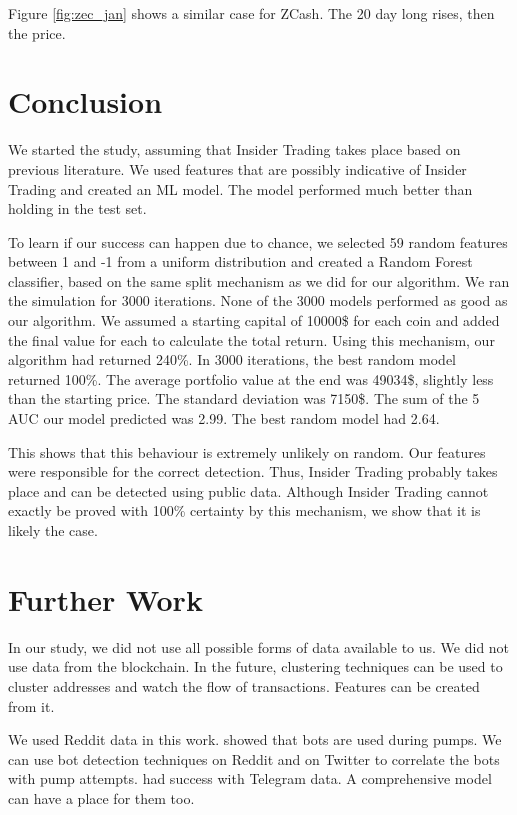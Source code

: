 \documentclass[letterpaper]{article}
\begin{document}
Figure \ref{fig:zec_jan} shows a similar case for ZCash. The 20 day long rises, then the price. 

\section{Conclusion}
\label{sec:conclusion}
We started the study, assuming that Insider Trading takes place based on previous literature. 
We used features that are possibly indicative of Insider Trading 
and created an ML model. The model performed much better than holding in the test set. \par

To learn if our success can happen due to chance, 
we selected 59 random features between 1 and -1 from a uniform distribution and created a 
Random Forest classifier, based on the same split mechanism as we did for our algorithm.
We ran the simulation for 3000 iterations. None of the 3000 models performed 
as good as our algorithm. We assumed a starting capital of 10000\$ for each coin and added the final 
value for each to calculate the total return. Using this mechanism, our algorithm had returned 
240\%. In 3000 iterations, the best random 
model returned 100\%. The average portfolio value at the end was 49034\$, slightly less than the starting price. 
The standard deviation was 7150\$. 
The sum of the 5 AUC our model predicted was 2.99. The best random model had 2.64.
 \par

 This shows that this behaviour is extremely unlikely on random. Our features were responsible for the correct 
 detection. Thus, Insider Trading probably 
takes place and can be detected using public data. Although Insider Trading cannot exactly be proved with 
100\% certainty by 
this mechanism, we show that it is likely the case.

\section{Further Work}
\label{sec:further_work}
In our study, we did not use all possible forms of data available to us. 
We did not use data from the blockchain. In the future, 
clustering techniques can be used to cluster addresses and 
watch the flow of transactions. Features can be created from it. \par

We used Reddit data in this work. \cite{mirtaheri2019identifying} showed that bots are used during 
pumps. We can use bot detection techniques on Reddit and on Twitter to correlate the 
 bots with pump attempts. \cite{xu2019anatomy,mirtaheri2019identifying} had 
success with Telegram data. A comprehensive model can have a place for them too.\par
\end{document}
